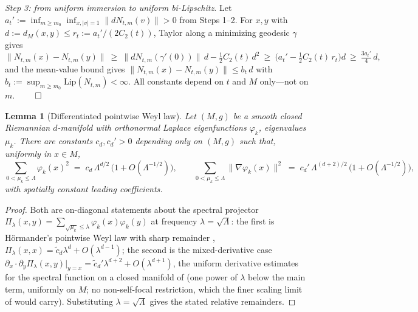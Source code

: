 \documentclass[11pt]{article}
\newtheorem{lemma}[theorem]{Lemma}
\theoremstyle{remark}
\begin{document}
\emph{Step 3: from uniform immersion to uniform bi-Lipschitz.} Let
$a_t':=\inf_{m\ge m_0}\inf_{x,\lvert v\rvert=1}\lVert dN_{t,m}(v)\rVert>0$
from Steps 1--2. For $x,y$ with $d:=d_M(x,y)\le r_t:=a_t'/(2C_2(t))$, Taylor
along a minimizing geodesic $\gamma$ gives
\[
\lVert N_{t,m}(x)-N_{t,m}(y)\rVert
\ \ge\ \lVert dN_{t,m}(\gamma'(0))\rVert\,d-\tfrac12C_2(t)\,d^2
\ \ge\ \Big(a_t'-\tfrac12C_2(t)\,r_t\Big)d\ \ge\ \tfrac{3a_t'}{4}\,d,
\]
and the mean-value bound gives
$\lVert N_{t,m}(x)-N_{t,m}(y)\rVert\le b_t\,d$ with
$b_t:=\sup_{m\ge m_0}\mathrm{Lip}(N_{t,m})<\infty$. All constants depend on
$t$ and $M$ only---not on $m$. \hfill$\qed$

\begin{lemma}[Differentiated pointwise Weyl law]\label{lem:dweyl}
Let $(M,g)$ be a smooth closed Riemannian $d$-manifold with orthonormal
Laplace eigenfunctions $\varphi_k$, eigenvalues $\mu_k$. There are constants
$c_d,c_d'>0$ depending only on $(M,g)$ such that, uniformly in $x\in M$,
\[
\sum_{0<\mu_k\le\Lambda}\varphi_k(x)^2
   \;=\; c_d\,\Lambda^{d/2}\,\bigl(1+O(\Lambda^{-1/2})\bigr),
\qquad
\sum_{0<\mu_k\le\Lambda}\lVert\nabla\varphi_k(x)\rVert^2
   \;=\; c_d'\,\Lambda^{(d+2)/2}\,\bigl(1+O(\Lambda^{-1/2})\bigr),
\]
with spatially constant leading coefficients.
\end{lemma}
\begin{proof}
Both are on-diagonal statements about the spectral projector
$\Pi_\lambda(x,y)=\sum_{\sqrt{\mu_k}\le\lambda}\varphi_k(x)\varphi_k(y)$ at
frequency $\lambda=\sqrt\Lambda$: the first is H\"ormander's pointwise Weyl law
with sharp remainder \cite{hormander1968},
$\Pi_\lambda(x,x)=\tilde c_d\lambda^{d}+O(\lambda^{d-1})$; the second is the
mixed-derivative case $\partial_{x}\!\cdot\!\partial_{y}\Pi_\lambda(x,y)
\big|_{y=x}=\tilde c_d'\lambda^{d+2}+O(\lambda^{d+1})$, the uniform derivative
estimates for the spectral function on a closed manifold of \cite{binxu2004} (one
power of $\lambda$ below the main term, uniformly on $M$; no non-self-focal
restriction, which the finer scaling limit of \cite{canzanihanin2015} would
carry). Substituting $\lambda=\sqrt\Lambda$
gives the stated relative remainders.
\end{proof}
\end{document}

